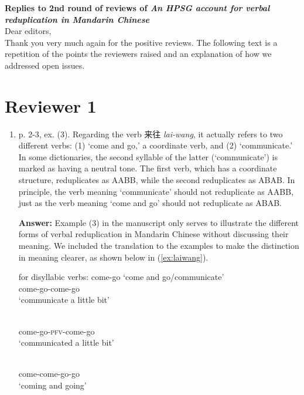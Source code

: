 \documentclass[fleqn,twoside]{article}
\begin{document}
\noindent
{\large\bf Replies to 2nd round of reviews of \emph{An HPSG account for verbal reduplication in Mandarin Chinese}}\\

\bigskip
\noindent
Dear editors,\\

\noindent
Thank you very much again for the positive reviews. The following text is a repetition of the points the
reviewers raised and an explanation of how we addressed open issues.

\section{Reviewer 1}\label{sec:1}

\begin{enumerate}
\item p. 2-3, ex. (3). Regarding the verb 来往 \textit{lai-wang}, it actually refers to two different verbs: (1) `come
and go,' a coordinate verb, and (2) `communicate.' In some dictionaries, the second syllable of the
latter (`communicate') is marked as having a neutral tone. The first verb, which has a coordinate
structure, reduplicates as AABB, while the second reduplicates as ABAB. In principle, the verb
meaning `communicate' should not reduplicate as AABB, just as the verb meaning `come and go'
should not reduplicate as ABAB.

\noindent
\textbf{Answer:} Example (3)  in the manuscript only serves to
 illustrate the different forms of verbal reduplication in Mandarin Chinese
  without discussing their meaning. 
  We included the translation to the examples 
  to make the distinction in meaning clearer, 
  as shown below in (\ref{ex:laiwang}).

\ea\label{ex:laiwang} for disyllabic verbs:  come-go `come and go/communicate'
\ea \gll {}\\
come-go-come-go\\ 
\glt `communicate a little bit'

\ex \gll {}\\
come-go-\textsc{pfv}-come-go\\ 
\glt `communicated a little bit'

\ex \gll {}\\
come-come-go-go\\ 
\glt `coming and going'


\end{enumerate}
\end{document}
